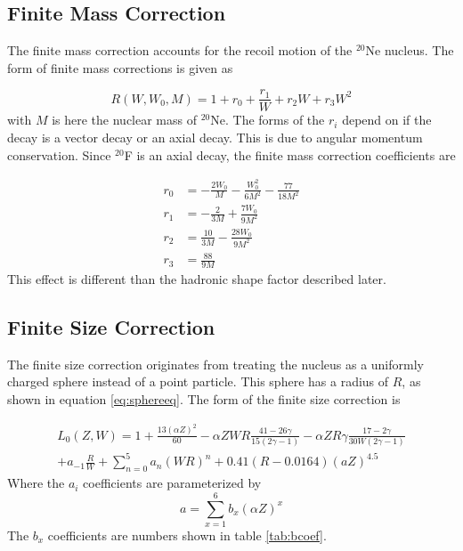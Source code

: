 \documentclass[../MaxHughesThesis.tex]{subfiles}
\begin{document}
\subsection{Finite Mass Correction}
The finite mass correction accounts for the recoil motion of the $^{20}$Ne nucleus.
The form of finite mass corrections is given as \cite{WIL90} %

\begin{equation}
	R(W,W_{0},M) = 1 + r_{0} + \frac{r_{1}}{W} + r_{2}W + r_{3}W^{2}
	\label{eq:finitemass}
\end{equation}
with $M$ is here the nuclear mass of $^{20}$Ne.
The forms of the $r_{i}$ depend on if the decay is a vector decay or an axial decay. 
This is due to angular momentum conservation.
Since $^{20}$F is an axial decay, the finite mass correction coefficients are %

\begin{equation}
	\label{eq:finitemassrs}
	\begin{split}
	r_{0} & = -\frac{2W_{0}}{M} - \frac{W_{0}^{2}}{6M^{2}} - \frac{77}{18M^{2}} \\
	r_{1} & = -\frac{2}{3M} + \frac{7W_{0}}{9M^{2}} \\
	r_{2} & = \frac{10}{3M} - \frac{28W_{0}}{9M^{2}} \\
	r_{3} & = \frac{88}{9M}
	\end{split}
\end{equation}
This effect is different than the hadronic shape factor described later. 

\subsection{Finite Size Correction}
The finite size correction originates from treating the nucleus as a uniformly charged sphere instead of a point particle.
This sphere has a radius of $R$, as shown in equation \ref{eq:sphereeq}.
The form of the finite size correction is \cite{WIL90} %

\begin{equation}
	\label{eq:finitesize}
	\begin{split}
	L_{0}(Z,W) = 1 + \frac{13(\alpha Z)^{2}}{60} - \alpha Z W R \frac{41 - 26\gamma}{15(2\gamma - 1)} - \alpha Z R \gamma \frac{17 - 2\gamma}{30W(2\gamma - 1)}  \\
	+ a_{-1} \frac{R}{W} + \sum_{n=0}^{5} a_{n} (W R)^{n} + 0.41(R - 0.0164)(a Z)^{4.5}
	\end{split}
\end{equation}
Where the $a_{i}$ coefficients are parameterized by %
\begin{equation}
	a = \sum_{x = 1}^{6} b_{x} (\alpha Z)^{x}
	\label{eq:A}
\end{equation}
The $b_{x}$ coefficients are numbers shown in table \ref{tab:bcoef}.
\end{document}
